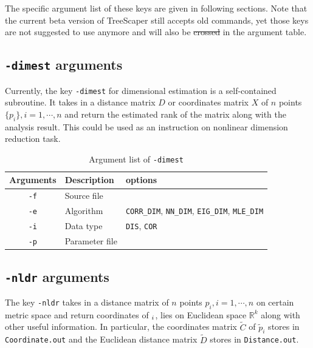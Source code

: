 \documentclass[11pt,a4paper]{article}
\theoremstyle{definition}
\theoremstyle{definition}
\numberwithin{equation}{section}
\begin{document}
	The specific argument list of these keys are given in following sections. Note that the current beta version of TreeScaper still accepts old commands, yet those keys are not suggested to use anymore and will also be \st{crossed} in the argument table.
	
	\clearpage
	\subsection{\texttt{-dimest} arguments}
	
	Currently, the key \texttt{-dimest} for dimensional estimation is a self-contained subroutine. It takes in a distance matrix $D$ or coordinates matrix $X$ of $n$ points $\{p_i\},i=1,\cdots,n$ and return the estimated rank of the matrix along with the analysis result. This could be used as an instruction on nonlinear dimension reduction task.
	
	\begin{table}[!h]
		\centering
		\begin{tabular}{cll}
			\hline
			Arguments & Description & options\\
			\hline
			\texttt{-f}& Source file &  \\
			\hline
			\texttt{-e}& Algorithm & \texttt{CORR\_DIM}, \texttt{NN\_DIM}, \texttt{EIG\_DIM}, \texttt{MLE\_DIM}\\
			\hline
			\texttt{-i}& Data type& \texttt{DIS}, \texttt{COR}\\
			\hline
			\texttt{-p}& Parameter file&\\
			\hline
		\end{tabular}
		\caption{Argument list of \texttt{-dimest}}
		\label{tab:dimestlist}
	\end{table}
	
	
	\subsection{\texttt{-nldr} arguments}
	
	The key \texttt{-nldr} takes in a distance matrix of $n$ points $p_i, i =1,\cdots, n$ on certain metric space and return coordinates of $\title{p}_i$, lies on Euclidean space $\mathbb{R}^k$ along with other useful information. In particular, the coordinates matrix $\tilde{C}$ of $\tilde{p}_i$ stores in \texttt{Coordinate.out} and the Euclidean distance matrix $\tilde{D}$ stores in \texttt{Distance.out}.
	
\end{document}
